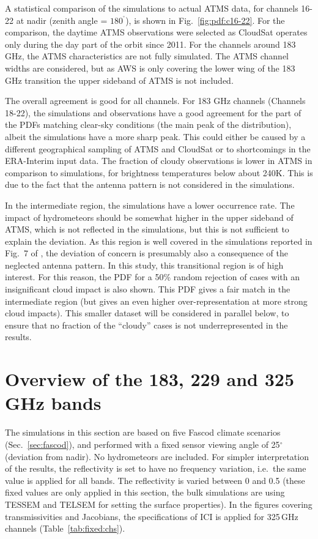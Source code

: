 \documentclass[12pt]{article}
\newcommand{\degree}{\ensuremath{\mathrm{^\circ}}}
\begin{document}
A statistical comparison of the simulations to actual ATMS data, for channels
16-22 at nadir (zenith angle = $180^{\degree}$), is shown in
Fig.~\ref{fig:pdf:c16-22}. For the comparison, the daytime ATMS observations
were selected as CloudSat operates only during the day part of the orbit since
2011. For the channels around 183\,GHz, the ATMS characteristics are not fully
simulated. The ATMS channel widths are considered, but as AWS is only covering
the lower wing of the 183\,GHz transition the upper sideband of ATMS is not
included.

The overall agreement is good for all channels. For 183 GHz channels (Channels
18-22), the simulations and observations have a good agreement for the part of
the PDFs matching clear-sky conditions (the main peak of the distribution),
albeit the simulations have a more sharp peak. This could either be caused by a
different geographical sampling of ATMS and CloudSat or to shortcomings in the
ERA-Interim input data. The fraction of cloudy observations is lower in ATMS in
comparison to simulations, for brightness temperatures below about 240\.K. This
is due to the fact that the antenna pattern is not considered in the
simulations.

In the intermediate region, the simulations have a lower occurrence rate. The
impact of hydrometeors should be somewhat higher in the upper sideband of ATMS,
which is not reflected in the simulations, but this is not sufficient to
explain the deviation. As this region is well covered in the simulations
reported in Fig.~7 of \citet{eriksson:towar:20}, the deviation of concern is
presumably also a consequence of the neglected antenna pattern. In this study,
this transitional region is of high interest. For this reason, the PDF for a
50\% random rejection of cases with an insignificant cloud impact is also
shown. This PDF gives a fair match in the intermediate region (but gives an
even higher over-representation at more strong cloud impacts). This smaller
dataset will be considered in parallel below, to ensure that no fraction of the
``cloudy'' cases is not underrepresented in the results.




\section{Overview of the 183, 229 and 325\,GHz bands}
\label{sec:overview}
% 
The simulations in this section are based on five Fascod climate scenarios
(Sec.~\ref{sec:fascod}), and performed with a fixed sensor viewing angle of
25$^\circ$ (deviation from nadir). No hydrometeors are included. For simpler
interpretation of the results, the reflectivity is set to have no frequency
variation, i.e.\ the same value is applied for all bands. The reflectivity is
varied between 0 and 0.5 (these fixed values are only applied in this section,
the bulk simulations are using TESSEM and TELSEM for setting the surface
properties). In the figures covering transmissivities and Jacobians, the
specifications of ICI is applied for 325\,GHz channels
(Table~\ref{tab:fixed:chs}).
\end{document}
